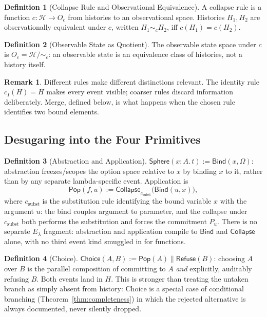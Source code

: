 \documentclass[12pt]{article}
\newcommand{\Sphere}{\mathsf{Sphere}}
\newcommand{\Pop}{\mathsf{Pop}}
\newcommand{\Choice}{\mathsf{Choice}}
\theoremstyle{definition}
\newtheorem{definition}{Definition}
\newtheorem{remark}{Remark}
\newcommand{\RefuseOp}{\mathsf{Refuse}}
\newcommand{\CollapseOp}{\mathsf{Collapse}}
\newcommand{\BindOp}{\mathsf{Bind}}
\newcommand{\CalH}{\mathcal{H}}
\begin{document}
\begin{definition}[Collapse Rule and Observational Equivalence]
A collapse rule is a function $c : \CalH \to O_c$ from histories to an observational space. Histories $H_1, H_2$ are observationally equivalent under $c$, written $H_1 \sim_c H_2$, iff $c(H_1) = c(H_2)$.
\end{definition}

\begin{definition}[Observable State as Quotient]
The observable state space under $c$ is $O_c = \CalH / {\sim_c}$: an observable state is an equivalence class of histories, not a history itself.
\end{definition}

\begin{remark}
Different rules make different distinctions relevant. The identity rule $c_I(H) = H$ makes every event visible; coarser rules discard information deliberately. Merge, defined below, is what happens when the chosen rule identifies two bound elements.
\end{remark}

\subsection{Desugaring into the Four Primitives}
\label{sec:desugar}

\begin{definition}[Abstraction and Application]
$\Sphere(x\!:\!A.\,t) := \BindOp(x, \Omega)$: abstraction freezes/scopes the option space relative to $x$ by binding $x$ to it, rather than by any separate lambda-specific event. Application is
\[
\Pop(f,u) := \CollapseOp_{c_\mathrm{subst}}\big(\BindOp(u, x)\big),
\]
where $c_\mathrm{subst}$ is the substitution rule identifying the bound variable $x$ with the argument $u$: the bind couples argument to parameter, and the collapse under $c_\mathrm{subst}$ both performs the substitution and forces the commitment $P_u$. There is no separate $E_\lambda$ fragment: abstraction and application compile to $\BindOp$ and $\CollapseOp$ alone, with no third event kind smuggled in for functions.
\end{definition}

\begin{definition}[Choice]
$\Choice(A,B) := \Pop(A) \parallel \RefuseOp(B)$: choosing $A$ over $B$ is the parallel composition of committing to $A$ \emph{and} explicitly, auditably refusing $B$. Both events land in $H$. This is stronger than treating the untaken branch as simply absent from history: Choice is a special case of conditional branching (Theorem~\ref{thm:completeness}) in which the rejected alternative is always documented, never silently dropped.
\end{definition}
\end{document}
